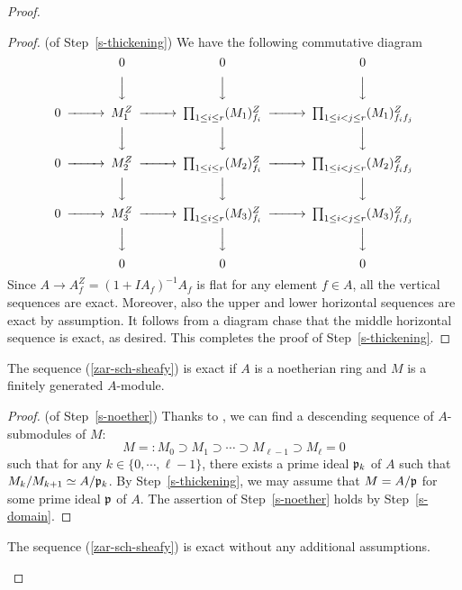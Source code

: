\begin{proof}
\begin{proof}(of Step~\ref{s-thickening}) 
We have the following commutative diagram 
$$\begin{CD}
@. 0 @. 0 @. 0 @.\\
@. @VVV @VVV @VVV\\
0 @>>> M_1^{Z} @>>> \prod_{1\leq i \leq r} (M_1)_{f_i}^Z @>>> \prod_{1 \leq i<j\leq r} (M_1)_{f_if_j}^Z\\
@. @VVV @VVV @VVV\\
0 @>>> M_2^{Z} @>>> \prod_{1\leq i \leq r} (M_2)_{f_i}^Z @>>> \prod_{1 \leq i<j\leq r} (M_2)_{f_if_j}^Z\\
@. @VVV @VVV @VVV\\
0 @>>> M_3^{Z} @>>> \prod_{1\leq i \leq r} (M_3)_{f_i}^Z @>>> \prod_{1 \leq i<j\leq r} (M_3)_{f_if_j}^Z\\
@. @VVV @VVV @VVV\\
@. 0 @. 0 @. 0 @.\\
\end{CD}$$
Since $A \to A^{Z}_f=(1+IA_f)^{-1}A_f$ is flat for any element $f \in A$, 
all the vertical sequences are exact. 
Moreover, also the upper and lower horizontal sequences are exact by assumption. 
It follows from a diagram chase that the middle horizontal sequence is exact, as desired. 
This completes the proof of Step~\ref{s-thickening}.
\end{proof}


\begin{step}\label{s-noether}
The sequence (\ref{zar-sch-sheafy}) is exact if $A$ is a noetherian ring and $M$ is a finitely generated $A$-module. 
\end{step}

\begin{proof}(of Step~\ref{s-noether}) 
Thanks to \cite[Theorem 6.5]{Mat89}, 
we can find a descending sequence of $A$-submodules of $M$: 
$$M=:M_0 \supset M_1 \supset \cdots \supset M_{\ell-1} \supset M_{\ell}=0$$
such that for any $k \in \{0, \cdots, \ell-1\}$, 
there exists a prime ideal $\mathfrak{p}_k$ of $A$ such that $M_k/M_{k+1} \simeq A/\mathfrak{p}_k$. 
By Step~\ref{s-thickening}, we may assume that $M=A/\mathfrak{p}$ for some prime ideal $\mathfrak{p}$ of $A$. 
The assertion of Step~\ref{s-noether} holds by Step~\ref{s-domain}. 
\end{proof}



\begin{step}\label{s-general}
The sequence (\ref{zar-sch-sheafy}) is exact without any additional assumptions. 
\end{step}


\end{proof}

